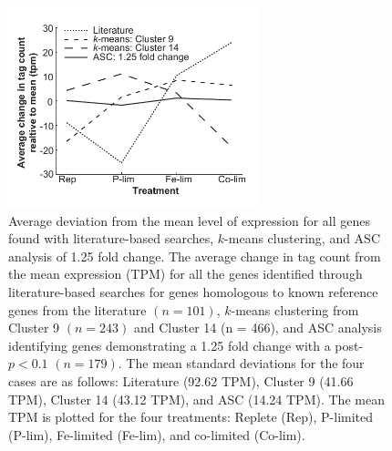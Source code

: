 \begin{figure}[h!]
  \centering
    \includegraphics[width=0.65\textwidth]{Images/C2_Figure2_v6.pdf}
    \caption[Average deviation from the mean level of expression for putative reference genes]{Average deviation from the mean level of expression for all genes found with literature-based searches, $k$-means clustering, and ASC analysis of 1.25 fold change. The average change in tag count from the mean expression (TPM) for all the genes identified through literature-based searches for genes homologous to known reference genes from the literature $(n = 101)$, $k$-means clustering from Cluster 9 $(n = 243)$ and Cluster 14 (n = 466), and ASC analysis identifying genes demonstrating a 1.25 fold change with a post-$p < 0.1$ $(n = 179)$. The mean standard deviations for the four cases are as follows: Literature (92.62 TPM), Cluster 9 (41.66 TPM), Cluster 14 (43.12 TPM), and ASC (14.24 TPM). The mean TPM is plotted for the four treatments: Replete (Rep), P-limited (P-lim), Fe-limited (Fe-lim), and co-limited (Co-lim).}
  \label{fig:c2f2}
\end{figure}


